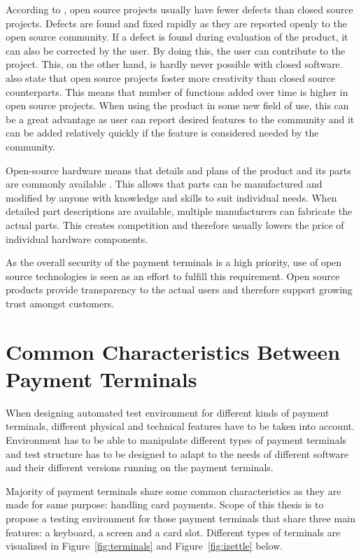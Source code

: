 According to \cite{paulson2004empirical}, open source projects usually have fewer defects than closed source projects. Defects are found and fixed rapidly as they are reported openly to the open source community. If a defect is found during evaluation of the product, it can also be corrected by the user. By doing this, the user can contribute to the project. This, on the other hand, is hardly never possible with closed software. \cite{paulson2004empirical} also state that open source projects foster more creativity than closed source counterparts. This means that number of functions added over time is higher in open source projects. When using the product in some new field of use, this can be a great advantage as user can report desired features to the community and it can be added relatively quickly if the feature is considered needed by the community.

Open-source hardware means that details and plans of the product and its parts are commonly available \citep{rubow2008open,acosta2009open}. This allows that parts can be manufactured and modified by anyone with knowledge and skills to suit individual needs. When detailed part descriptions are available, multiple manufacturers can fabricate the actual parts. This creates competition and therefore usually lowers the price of individual hardware components.

As the overall security of the payment terminals is a high priority, use of open source technologies is seen as an effort to fulfill this requirement. Open source products provide transparency to the actual users and therefore support growing trust amongst customers.

\section{Common Characteristics Between Payment Terminals}
\label{section:payment terminals}

When designing automated test environment for different kinds of payment terminals, different physical and technical features have to be taken into account. Environment has to be able to manipulate different types of payment terminals and test structure has to be designed to adapt to the needs of different software and their different versions running on the payment terminals.

Majority of payment terminals share some common characteristics as they are made for same purpose: handling card payments. Scope of this thesis is to propose a testing environment for those payment terminals that share three main features: a keyboard, a screen and a card slot. Different types of terminals are visualized in Figure~\ref{fig:terminals} and Figure~\ref{fig:izettle} below.

